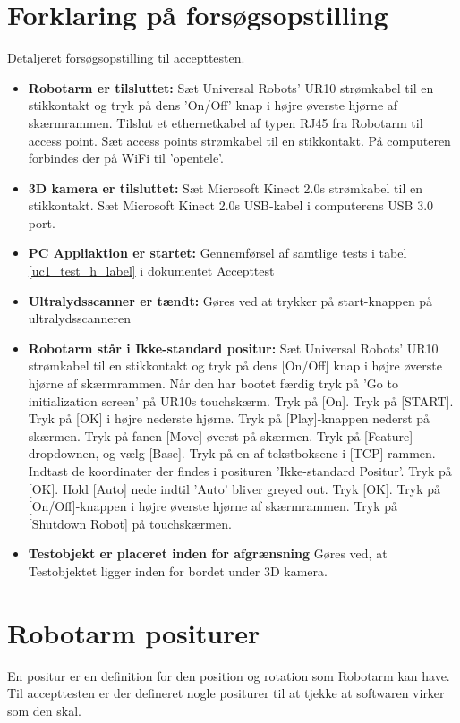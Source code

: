 \section{Forklaring på forsøgsopstilling}
Detaljeret forsøgsopstilling til accepttesten. 

\begin{itemize}
\item \textbf{Robotarm er tilsluttet:} Sæt Universal Robots' UR10 strømkabel til en stikkontakt og tryk på dens 'On/Off' knap i højre øverste hjørne af skærmrammen. Tilslut et ethernetkabel af typen RJ45 fra Robotarm til access point. Sæt access points strømkabel til en stikkontakt. På computeren forbindes der på WiFi til 'opentele'.
\item \textbf{3D kamera er tilsluttet:} Sæt Microsoft Kinect 2.0s strømkabel til en stikkontakt. Sæt Microsoft Kinect 2.0s USB-kabel i computerens USB 3.0 port.
\item \textbf{PC Appliaktion er startet:} Gennemførsel af samtlige tests i tabel \ref{uc1_test_h_label} i dokumentet Accepttest
\item \textbf{Ultralydsscanner er tændt:} Gøres ved at trykker på start-knappen på ultralydsscanneren
\item \textbf{Robotarm står i Ikke-standard positur:} Sæt Universal Robots' UR10 strømkabel til en stikkontakt og tryk på dens [On/Off] knap i højre øverste hjørne af skærmrammen. Når den har bootet færdig tryk på 'Go to initialization screen' på UR10s touchskærm. Tryk på [On]. Tryk på [START]. Tryk på [OK] i højre nederste hjørne. Tryk på [Play]-knappen nederst på skærmen. Tryk på fanen [Move] øverst på skærmen. Tryk på [Feature]-dropdownen, og vælg [Base]. Tryk på en af tekstboksene i [TCP]-rammen. Indtast de koordinater der findes i posituren 'Ikke-standard Positur'. Tryk på [OK]. Hold [Auto] nede indtil 'Auto' bliver greyed out. Tryk [OK]. Tryk på [On/Off]-knappen i højre øverste hjørne af skærmrammen. Tryk på [Shutdown Robot] på touchskærmen.
\item \textbf{Testobjekt er placeret inden for afgrænsning} Gøres ved, at Testobjektet ligger inden for bordet under 3D kamera. 
\end{itemize}


\section{Robotarm positurer}
En positur er en definition for den position og rotation som Robotarm kan have. Til accepttesten er der defineret nogle positurer til at tjekke at softwaren virker som den skal. 


